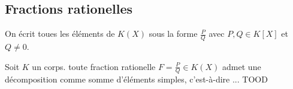\subsection{Fractions rationelles}

\begin{definition}
	On écrit toues les éléments de $K(X)$ sous la forme $\frac{P}{Q}$ avec $P,Q \in K[X]$ et $Q \neq 0$.
\end{definition}

\begin{theorem} %
	Soit $K$ un corps. toute fraction rationelle $F = \frac{P}{Q} \in K(X)$ admet une décomposition comme somme
	d'éléments simples, c'est-à-dire ... TOOD
\end{theorem}



